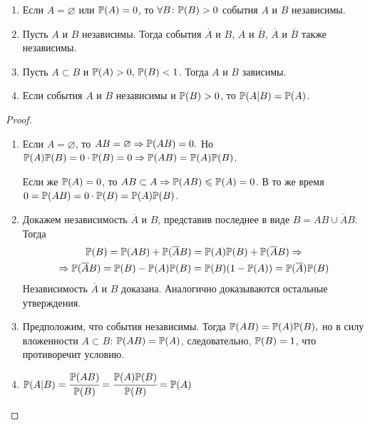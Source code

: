 \begin{namedthm}\leavevmode
    \begin{enumerate}
        \item Если $A = \varnothing$ или ${\mathbb{P}(A)} = 0$, то $\forall B \colon {\mathbb{P}(B)} > 0$ события $A$ и $B$ независимы.
        \item Пусть $A$ и $B$ независимы. Тогда события $\overline{A}$ и $B$, $A$ и $\overline{B}$, $\overline{A}$ и $\overline{B}$ также независимы. 
        \item Пусть $A \subset B$ и ${\mathbb{P}(A)} > 0, \, {\mathbb{P}(B)} < 1$. Тогда $A$ и $B$ зависимы. 
        \item Если события $A$ и $B$ независимы и ${\mathbb{P}(B)} > 0$, то ${\mathbb{P}(A|B)} = {\mathbb{P}(A)}$.
    \end{enumerate}
\end{namedthm}

\begin{proof}
\begin{enumerate} 
    \item Если $A = \varnothing$, то $AB = \varnothing \Rightarrow {\mathbb{P}(AB)} = 0.$ Но $ {\mathbb{P}(A)}{\mathbb{P}(B)} = 0 \cdot {\mathbb{P}(B)} = 0 \Rightarrow {\mathbb{P}(AB)} = {\mathbb{P}(A)} {\mathbb{P}(B)}$.
    
    Если же ${{\mathbb{P}(A)} = 0}$, то ${AB \subset A \Rightarrow \mathbb{P}(AB) \leqslant {\mathbb{P}(A)} = 0}$. В то же время ${0 = {\mathbb{P}(AB)} = 0 \cdot {\mathbb{P}(B)} = {\mathbb{P}(A)} {\mathbb{P}(B)}}$.

    \item Докажем независимость $\overline{A}$ и $B$, представив последнее в виде $B = AB \cup \overline{A}B$. Тогда
    \begin{multline*}
        {\mathbb{P}(B)} = {\mathbb{P}(AB)} + {\mathbb{P}(\overline{A}B)} = {\mathbb{P}(A)}{\mathbb{P}(B)} + {\mathbb{P}(\overline{A}B)} \Rightarrow \\
        \Rightarrow {\mathbb{P}(\overline{A}B)} = {\mathbb{P}(B)} - {\mathbb{P}(A)}{\mathbb{P}(B)} = {\mathbb{P}(B)} (1 - {\mathbb{P}(A)}) = {\mathbb{P}(\overline{A})}{\mathbb{P}(B)}
    \end{multline*}
    Независимость $\overline{A}$ и $B$ доказана. Аналогично доказываются остальные утверждения.
    \item Предположим, что события независимы. Тогда ${\mathbb{P}(AB)} = {\mathbb{P}(A)}{\mathbb{P}(B)},$ но в силу вложенности $A \subset B$: ${\mathbb{P}(AB)} = {\mathbb{P}(A)}$, следовательно, ${\mathbb{P}(B)} = 1$, что противоречит условию.
    \item ${\mathbb{P}(A | B)} = \cfrac{{\mathbb{P}(AB)}}{{\mathbb{P}(B)}} = \cfrac{{\mathbb{P}(A)}{\mathbb{P}(B)}}{{\mathbb{P}(B)}} = {\mathbb{P}(A)}$
\end{enumerate}
\end{proof}

